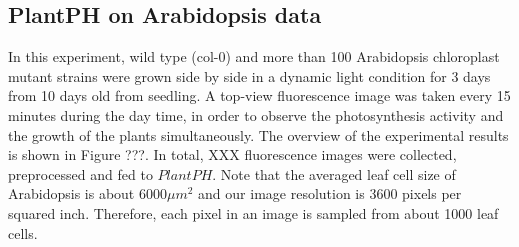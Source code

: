 { %

%
%
%
%


\subsection*{PlantPH on Arabidopsis data}

In this experiment, wild type (col-0) and more than 100 Arabidopsis chloroplast mutant strains were grown side by side in a dynamic light condition for 3 days from 10 days old from seedling. A top-view fluorescence image was taken every 15 minutes during the day time, in order to observe the photosynthesis activity and the growth of the plants simultaneously. The overview of the experimental results is shown in Figure ???. In total, XXX fluorescence images were collected, preprocessed and fed to $PlantPH$. Note that the averaged leaf cell size of Arabidopsis is about $6000 \mu m^2$ \cite{gegas2014endopolyploidy} and our image resolution is 3600 pixels per squared inch. Therefore, each pixel in an image is sampled from about 1000 leaf cells.

}
